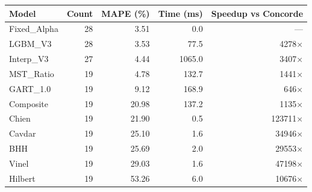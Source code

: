 \begin{tabular}{l r r r r}
\toprule
Model & Count & MAPE (\%) & Time (ms) & Speedup vs Concorde \\
\midrule
Fixed_Alpha & 28 & 3.51 & 0.0 & --- \\
LGBM_V3 & 28 & 3.53 & 77.5 & 4278$\times$ \\
Interp_V3 & 27 & 4.44 & 1065.0 & 3407$\times$ \\
MST_Ratio & 19 & 4.78 & 132.7 & 1441$\times$ \\
GART_1.0 & 19 & 9.12 & 168.9 & 646$\times$ \\
Composite & 19 & 20.98 & 137.2 & 1135$\times$ \\
Chien & 19 & 21.90 & 0.5 & 123711$\times$ \\
Cavdar & 19 & 25.10 & 1.6 & 34946$\times$ \\
BHH & 19 & 25.69 & 2.0 & 29553$\times$ \\
Vinel & 19 & 29.03 & 1.6 & 47198$\times$ \\
Hilbert & 19 & 53.26 & 6.0 & 10676$\times$ \\
\bottomrule
\end{tabular}
